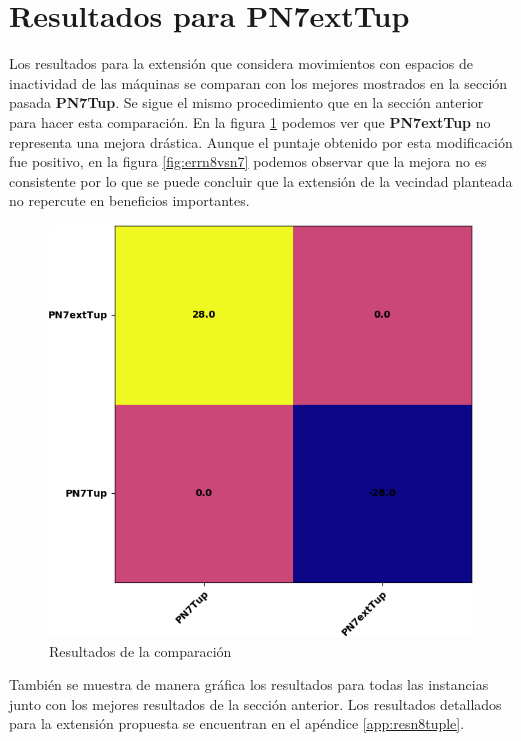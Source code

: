 \section{Resultados para PN7extTup}
Los resultados para la extensión que considera movimientos con espacios de inactividad de las máquinas se comparan con los mejores mostrados en la sección pasada \textbf{PN7Tup}. Se sigue el mismo procedimiento que en la sección anterior para hacer esta comparación. En la figura \ref{fig:n8vsn7} podemos ver que \textbf{PN7extTup} no representa una mejora drástica. Aunque el puntaje obtenido por esta modificación fue positivo, en la figura \ref{fig:errn8vsn7} podemos observar que la mejora no es consistente por lo que se puede concluir que la extensión de la vecindad planteada no repercute en beneficios importantes.

\begin{figure}[hbtp]
    \centering
    \includegraphics[scale=.7]{Imagenes/n8vsn7.png}
    \caption{Resultados de la comparación}
    \label{fig:n8vsn7}
\end{figure}

También se muestra de manera gráfica los resultados para todas las instancias junto con los mejores resultados de la sección anterior. Los resultados detallados para la extensión propuesta se encuentran en el apéndice \ref{app:resn8tuple}.

